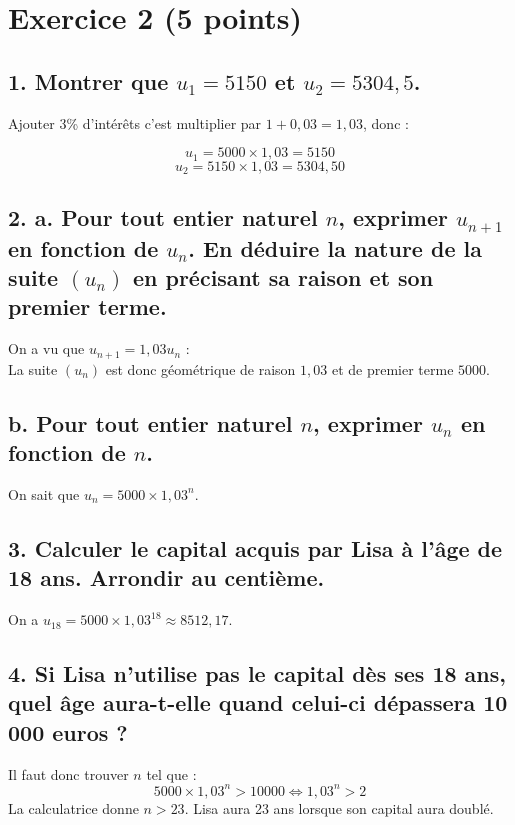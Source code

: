 \section*{Exercice 2 (5 points)}
	\subsection*{1. Montrer que $u_1 = 5150$ et $u_2 = 5304,5$.}
	
Ajouter 3\% d’intérêts c’est multiplier par $1 + 0,03 = 1,03$, donc :
	
	\[
	u_1 = 5000 \times 1,03 = 5150
	\]
	\[
	u_2 = 5150 \times 1,03 = 5304,50
	\]
	
	\subsection*{2. a. Pour tout entier naturel $n$, exprimer $u_{n+1}$ en fonction de $u_n$. En déduire la nature de la suite $(u_n)$ en précisant sa raison et son premier terme.}
On a vu que $u_{n+1} = 1,03u_n$ : \\
La suite $(u_n)$ est donc géométrique de raison $1,03$ et de premier terme $5 000$.
	
	\subsection*{b. Pour tout entier naturel $n$, exprimer $u_n$ en fonction de $n$.}
On sait que $u_n = 5000 \times 1,03^n$.
	
	\subsection*{3. Calculer le capital acquis par Lisa à l’âge de 18 ans. Arrondir au centième.}
On a $u_{18} = 5000 \times 1,03^{18} \approx 8512,17$.
	
	\subsection*{4. Si Lisa n’utilise pas le capital dès ses 18 ans, quel âge aura-t-elle quand celui-ci dépassera 10 000 euros ?}
Il faut donc trouver $n$ tel que :
	\[
	5000 \times 1,03^n > 10000 \iff 1,03^n > 2
	\]
La calculatrice donne $n > 23$. Lisa aura 23 ans lorsque son capital aura doublé.

